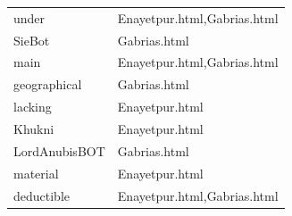 \documentclass{article}
\begin{document}
\begin{table}[h]
\begin{tabular}{|l|l|}
				under                       & Enayetpur.html,Gabrias.html    \\
				SieBot                      & Gabrias.html                   \\
				main                        & Enayetpur.html,Gabrias.html    \\
				geographical                & Gabrias.html                   \\
				lacking                     & Enayetpur.html                 \\
				Khukni                      & Enayetpur.html                 \\
				LordAnubisBOT               & Gabrias.html                   \\
				material                    & Enayetpur.html                 \\
				deductible                  & Enayetpur.html,Gabrias.html    \\ \hline
			\end{tabular}
		\end{table}
		
		
\end{document}
